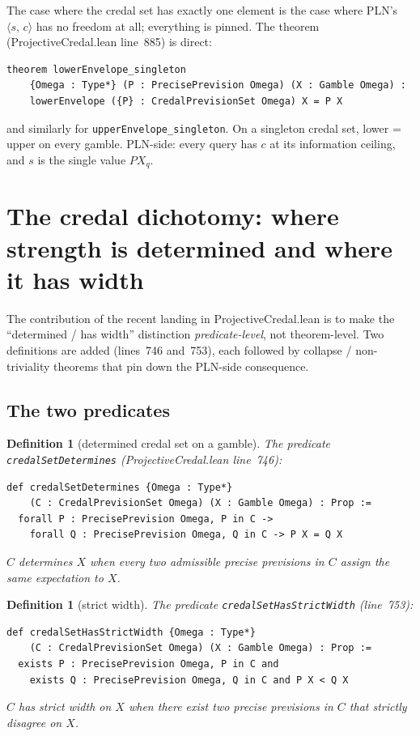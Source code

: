 \documentclass[]{article}
\newtheorem{definition}[theorem]{Definition}
\newcommand{\lid}[1]{{\ttfamily\nolinkurl{#1}}}
\newcommand{\STV}[2]{\langle #1,\, #2 \rangle}
\begin{document}
The case where the credal set has exactly one element is the case where
PLN's $\STV{s}{c}$ has no freedom at all; everything is pinned. The
theorem (ProjectiveCredal.lean line~885) is direct:
\begin{lstlisting}
theorem lowerEnvelope_singleton
    {Omega : Type*} (P : PrecisePrevision Omega) (X : Gamble Omega) :
    lowerEnvelope ({P} : CredalPrevisionSet Omega) X = P X
\end{lstlisting}
and similarly for \lid{upperEnvelope\_singleton}. On a singleton credal
set, lower = upper on every gamble. PLN-side: every query has $c$ at its
information ceiling, and $s$ is the single value $P X_q$.

\section{The credal dichotomy: where strength is determined and where it has width}\label{sec:dichotomy}

The contribution of the recent landing in ProjectiveCredal.lean is to
make the ``determined / has width'' distinction \emph{predicate-level},
not theorem-level. Two definitions are added (lines~746 and~753), each
followed by collapse / non-triviality theorems that pin down the
PLN-side consequence.

\subsection{The two predicates}

\begin{definition}[determined credal set on a gamble]\label{def:determines}
The predicate \lid{credalSetDetermines} (ProjectiveCredal.lean line~746):
\begin{lstlisting}
def credalSetDetermines {Omega : Type*}
    (C : CredalPrevisionSet Omega) (X : Gamble Omega) : Prop :=
  forall P : PrecisePrevision Omega, P in C ->
    forall Q : PrecisePrevision Omega, Q in C -> P X = Q X
\end{lstlisting}
$C$ \emph{determines} $X$ when every two admissible precise previsions in
$C$ assign the same expectation to $X$.
\end{definition}

\begin{definition}[strict width]\label{def:strictwidth}
The predicate \lid{credalSetHasStrictWidth} (line~753):
\begin{lstlisting}
def credalSetHasStrictWidth {Omega : Type*}
    (C : CredalPrevisionSet Omega) (X : Gamble Omega) : Prop :=
  exists P : PrecisePrevision Omega, P in C and
    exists Q : PrecisePrevision Omega, Q in C and P X < Q X
\end{lstlisting}
$C$ has \emph{strict width} on $X$ when there exist two precise previsions
in $C$ that strictly disagree on $X$.
\end{definition}
\end{document}
